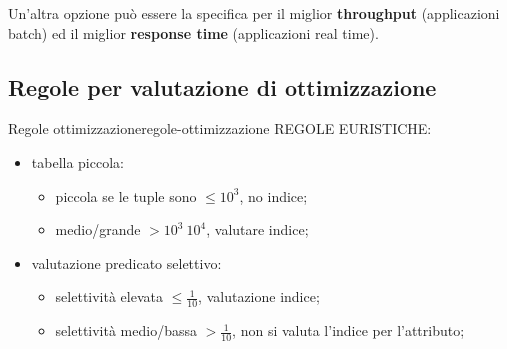 \documentclass[12pt]{article}
\begin{document}
Un'altra opzione pu\`o essere la specifica per il miglior \textbf{throughput} (applicazioni batch) ed il miglior \textbf{response time} (applicazioni real time).

\subsection{Regole per valutazione di ottimizzazione}

\begin{theorem}{Regole ottimizzazione}{regole-ottimizzazione}
    REGOLE EURISTICHE:
    \begin{itemize}
        \item tabella piccola:
            \begin{itemize}
                \item piccola se le tuple sono $ \leqslant10^{3}$, no indice;
                \item medio/grande $ > 10^{3} ~ 10^{4}$, valutare indice;
            \end{itemize}
        \item valutazione predicato selettivo:
            \begin{itemize}
                \item selettivit\`a elevata $ \leqslant \frac{1}{10}$, valutazione indice;
                \item selettivit\`a medio/bassa $ > \frac{1}{10} $, non si valuta l'indice per l'attributo;
            \end{itemize}
    \end{itemize}


\end{theorem}
\end{document}
